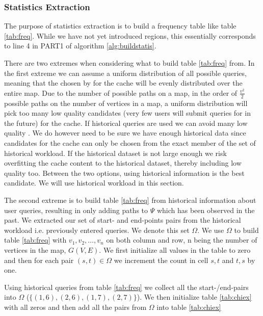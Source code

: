 \subsubsection{Statistics Extraction}\label{sec:statextract}


The purpose of statistics extraction is to build a frequency table like table \ref{tab:freq}. While we have not yet introduced regions, this essentially corresponds to line 4 in PART1 of algorithm \ref{alg:buildstatis}.

There are two extremes when considering what to build table \ref{tab:freq} from. 
In the first extreme we can assume a uniform distribution of all possible queries, meaning that the \spaths chosen by \salgo for the cache will be evenly distributed over the entire map. Due to the number of possible paths on a map, in the order of $\frac{v^2}{2}$ possible paths on the number of vertices in a map, a uniform distribution will pick too many low quality candidates (\spaths very few users will submit queries for in the future) for the cache. If historical queries are used we can avoid many low quality \spathsns. We do however need to be sure we have enough historical data since candidates for the cache can only be chosen from the exact member of the set of historical workload. If the historical dataset is not large enough we risk overfitting the cache content to the historical dataset, thereby including low quality \spaths too. Between the two options, using historical information is the best candidate. We will use historical workload in this section.

The second extreme is to build table \ref{tab:freq} from historical information about user queries, resulting in \salgo only adding paths to $\Psi$ which has been observed in the past. We extracted our set of start- and end-points pairs from the historical workload i.e. previously entered \spath queries. We denote this set $\Omega$. We use $\Omega$ to build table \ref{tab:freq} with $v_1,v_2,\ldots,v_n$ on both column and row, n being the number of vertices in the map, $G(V,E)$. We first initialize all values in the table to zero and then for each pair $(s,t) \in \Omega$ we increment the count in cell $s,t$ and $t,s$ by one.

Using historical queries from table \ref{tab:freq} we collect all the start-/end-pairs into $\Omega$ ($\{(1,6),(2,6),(1,7),(2,7)\}$). We then initialize table \ref{tab:chiex} with all zeros and then add all the pairs from $\Omega$ into table \ref{tab:chiex}

